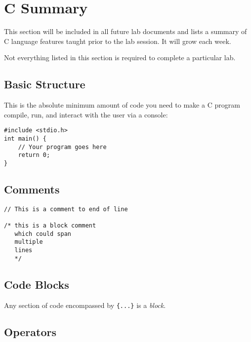 \documentclass{lab}
\begin{document}
\section{C Summary}
This section will be included in all future lab documents and lists a summary of C language features taught prior to the lab session. It will grow each week.

Not everything listed in this section is required to complete a particular lab.

\begin{multicols}{2}
\subsection{Basic Structure}
This is the absolute minimum amount of code you need to make a C program compile, run, and interact with the user via a console:
\begin{lstlisting}[style=CStyle]
#include <stdio.h>
int main() {
	// Your program goes here
	return 0;
}
\end{lstlisting}
\subsection{Comments}
\begin{lstlisting}[style=CStyle]
// This is a comment to end of line

/* this is a block comment
   which could span
   multiple
   lines
   */
\end{lstlisting}

\subsection{Code Blocks}

Any section of code encompassed by \texttt{\{...\}} is a \textit{block}.

\subsection{Operators}\label{sec:operators}


\end{multicols}
\end{document}
